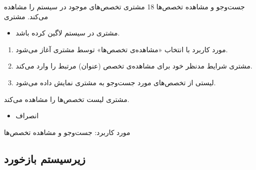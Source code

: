 {
	\usecase
	{جست‌وجو و مشاهده تخصص‌ها}
	{18}
	{مشتری تخصص‌های موجود در سیستم را مشاهده می‌کند.}
	{مشتری}
	{}
	{
		
		\begin{itemize}
			\item
			مشتری در سیستم لاگین کرده باشد.
			
		
		\end{itemize}	
		
		
	}
	{
		\vspace*{-0.6cm}
		\begin{enumerate}
			\item 
		مورد کاربرد با انتخاب «مشاهده‌ی تخصص‌ها» توسط مشتری آغاز می‌شود.
		\item 
		مشتری شرایط مدنظر خود برای مشاهده‌ی تخصص (عنوان) مرتبط را وارد می‌کند.
		\item 
		لیستی از تخصص‌های مورد جست‌وجو به مشتری نمایش داده می‌شود.
			
		\end{enumerate}
	}
	{مشتری لیست تخصص‌ها را مشاهده می‌کند.}
	{
		\begin{itemize}
			\vspace*{-0.6cm}
			\item انصراف
		\end{itemize}
	}
	{
		مورد کاربرد: جست‌وجو و مشاهده تخصص‌ها
	}
	
}



\newpage

\subsection{زیرسیستم بازخورد}

